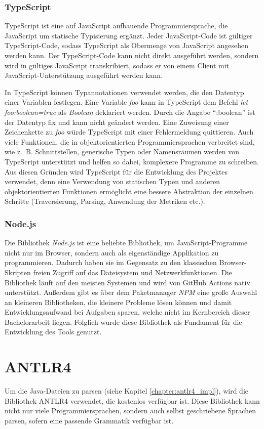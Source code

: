 \subsubsection{TypeScript}
TypeScript \cite{typescript} ist eine auf JavaScript aufbauende Programmiersprache, die JavaScript um statische Typisierung ergänzt. Jeder JavaScript-Code ist gültiger TypeScript-Code, sodass TypeScript als Obermenge von JavaScript angesehen werden kann. Der TypeScript-Code kann nicht direkt ausgeführt werden, sondern wird in gültiges JavaScript transkribiert, sodass er von einem Client mit JavaScript-Unterstützung ausgeführt werden kann. 

In TypeScript können Typannotationen verwendet werden, die den Datentyp einer Variablen festlegen. Eine Variable \textit{foo} kann in TypeScript dem Befehl \textit{let foo:boolean=true} als \textit{Boolean} deklariert werden. Durch die Angabe \enquote{:boolean} ist der Datentyp fix und kann nicht geändert werden. Eine Zuweisung einer Zeichenkette zu \textit{foo} würde TypeScript mit einer Fehlermeldung quittieren. Auch viele Funktionen, die in objektorientierten Programmiersprachen verbreitet sind, wie z.~B. Schnittstellen, generische Typen oder Namensräumen werden von TypeScript unterstützt und helfen so dabei, komplexere Programme zu schreiben. Aus diesen Gründen wird TypeScript für die Entwicklung des Projektes verwendet, denn eine Verwendung von statischen Typen und anderen objektorientierten Funktionen ermöglicht eine bessere Abstraktion der einzelnen Schritte (Traversierung, Parsing, Anwendung der Metriken etc.). 

\subsubsection{Node.js}
Die Bibliothek  \textit{Node.js} \cite{nodejs} ist eine beliebte Bibliothek, um JavaScript-Programme nicht nur im Browser, sondern auch als eigenständige Applikation zu programmieren. Dadurch haben sie im Gegensatz zu den klassischen Browser-Skripten freien Zugriff auf das Dateisystem und Netzwerkfunktionen.  Die Bibliothek läuft auf den meisten Systemen und  wird von GitHub Actions nativ unterstützt. Außerdem gibt es über dem Paketmanager \textit{NPM} eine große Auswahl an kleineren Bibliotheken, die kleinere Probleme lösen können und damit Entwicklungsaufwand bei Aufgaben sparen, welche nicht im Kernbereich dieser Bachelorarbeit liegen. Folglich wurde diese Bibliothek als Fundament für die Entwicklung des Tools genutzt. 
\section{ANTLR4}\label{chapter:antlr}
Um die Java-Dateien zu parsen (siehe Kapitel \ref{chapter:antlr4_impl}), wird die Bibliothek ANTLR4 \cite{ANTLR} verwendet, die kostenlos verfügbar ist. Diese Bibliothek kann nicht nur viele Programmiersprachen, sondern auch selbst geschriebene Sprachen parsen, sofern eine passende Grammatik verfügbar ist. 

